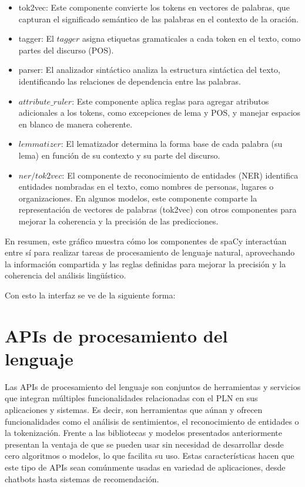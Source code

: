 \begin{itemize}
	\item tok2vec: Este componente convierte los tokens en vectores de palabras, que capturan el significado semántico de las palabras en el contexto de la oración.
	\item tagger: El $tagger$ asigna etiquetas gramaticales a cada token en el texto, como partes del discurso (POS).
	\item  parser: El analizador sintáctico analiza la estructura sintáctica del texto, identificando las relaciones de dependencia entre las palabras. 
	\item $attribute\_ruler$: Este componente aplica reglas para agregar atributos adicionales a los tokens, como excepciones de lema y POS, y manejar espacios en blanco de manera coherente.
	\item $lemmatizer$: El lematizador determina la forma base de cada palabra (su lema) en función de su contexto y su parte del discurso.
	\item $ner/tok2vec$: El componente de reconocimiento de entidades (NER) identifica entidades nombradas en el texto, como nombres de personas, lugares o organizaciones. En algunos modelos, este componente comparte la representación de vectores de palabras (tok2vec) con otros componentes para mejorar la coherencia y la precisión de las predicciones.
\end{itemize}
En resumen, este gráfico muestra cómo los componentes de spaCy interactúan entre sí para realizar tareas de procesamiento de lenguaje natural, aprovechando la información compartida y las reglas definidas para mejorar la precisión y la coherencia del análisis lingüístico.







Con esto la interfaz se ve de la siguiente forma: 

\section{APIs de procesamiento del lenguaje}

Las APIs de procesamiento del lenguaje son conjuntos de herramientas y servicios que integran múltiples funcionalidades relacionadas con el PLN en sus aplicaciones y sistemas. Es decir, son herramientas que aúnan y ofrecen funcionalidades como el análisis de sentimientos, el reconocimiento de entidades o la tokenización. Frente a las bibliotecas y modelos presentados anteriormente presentan la ventaja de que se pueden usar sin necesidad de desarrollar desde cero algoritmos o modelos, lo que facilita su uso. Estas características hacen que este tipo de APIs sean comúnmente usadas en variedad de aplicaciones, desde chatbots hasta sistemas de recomendación. 

